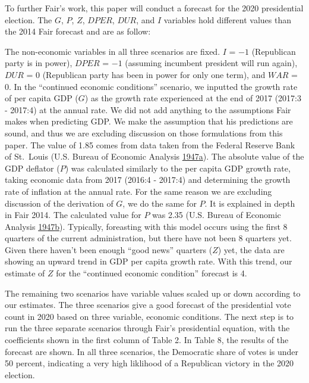 \documentclass[11,]{article}
\begin{document}
To further Fair's work, this paper will conduct a forecast for the 2020
presidential election. The \(G\), \(P\), \(Z\), \(DPER\), \(DUR\), and
\(I\) variables hold different values than the 2014 Fair forecast and
are as follow:

The non-economic variables in all three scenarios are fixed. \(I\) =
\(-1\) (Republican party is in power), \(DPER\) = \(-1\) (assuming
incumbent president will run again), \(DUR\) = 0 (Republican party has
been in power for only one term), and \(WAR\) = 0. In the ``continued
economic conditions'' scenario, we inputted the growth rate of per
capita GDP (\(G\)) as the growth rate experienced at the end of 2017
(2017:3 - 2017:4) at the annual rate. We did not add anything to the
assumptions Fair makes when predicting GDP. We make the assumption that
his predictions are sound, and thus we are excluding discussion on those
formulations from this paper. The value of 1.85 comes from data taken
from the Federal Reserve Bank of St.~Louis (U.S. Bureau of Economic
Analysis
\protect\hyperlink{ref-FRED_1947}{1947}\protect\hyperlink{ref-FRED_1947}{a}).
The absolute value of the GDP deflator (\(P\)) was calculated similarly
to the per capita GDP growth rate, taking economic data from 2017
(2016:4 - 2017:4) and determining the growth rate of inflation at the
annual rate. For the same reason we are excluding discussion of the
derivation of \(G\), we do the same for \(P\). It is explained in depth
in Fair 2014. The calculated value for \(P\) was 2.35 (U.S. Bureau of
Economic Analysis
\protect\hyperlink{ref-us_bureau_of_economic_analysis_gross_1947}{1947}\protect\hyperlink{ref-us_bureau_of_economic_analysis_gross_1947}{b}).
Typically, foreasting with this model occurs using the first 8 quarters
of the current administration, but there have not been 8 quarters yet.
Given there haven't been enough ``good news'' quarters (\(Z\)) yet, the
data are showing an upward trend in GDP per capita growth rate. With
this trend, our estimate of \(Z\) for the ``continued economic
condition'' forecast is 4.

The remaining two scenarios have variable values scaled up or down
according to our estimates. The three scenarios give a good forecast of
the presidential vote count in 2020 based on three variable, economic
conditions. The next step is to run the three separate scenarios through
Fair's presidential equation, with the coefficients shown in the first
column of Table 2. In Table 8, the results of the forecast are shown. In
all three scenarios, the Democratic share of votes is under 50 percent,
indicating a very high liklihood of a Republican victory in the 2020
election.
\end{document}
